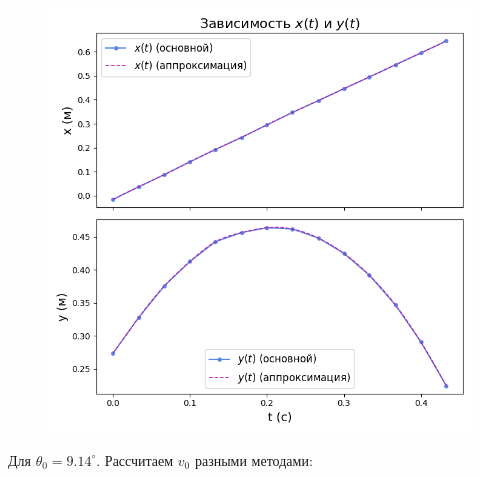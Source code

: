 \documentclass{report}
\begin{document}
\begin{enumerate}
\begin{figure}[H]
\center
\includegraphics[scale=0.6]{gra_1.png}
\end{figure}

\end{enumerate}

Для $\theta_0= 9.14^{\circ}$. Рассчитаем $v_0$ разными методами:
\end{document}
